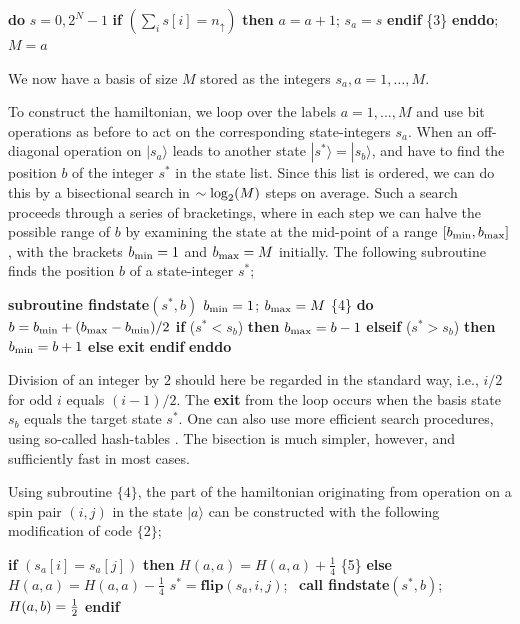 \documentclass[draft,numberedheadings]{aipproc}
\newcommand{\up}{\uparrow}
\newcommand{\half}{\hbox{$\frac{1}{2}$}}
\newcommand{\code}{\null\vskip-2mm\noindent}
\newcommand{\br}{\hfill\break}
\newcommand{\cia}{\null\hskip5mm}
\newcommand{\cib}{\null\hskip10mm}
\newcommand{\cic}{\null\hskip15mm}
\begin{document}
{\code
\cia {\bf do} $s=0,2^N-1$ \br
\cib     {\bf if} $(\sum_i s[i]=n_\up)$ {\bf then} $a=a+1$; $s_a=s$ {\bf endif} \hfill \{3\}\break
\cia {\bf enddo}; $M=a$
\code}

\noindent
We now have a basis of size $M$ stored as the integers $s_a,a=1,\ldots,M$.

To construct the hamiltonian, we loop over the labels $a=1,...,M$ and use bit operations as before to act on the corresponding state-integers $s_a$. When  
an off-diagonal operation on $|s_a\rangle$ leads to another state $|s^*\rangle=|s_b\rangle$, and have to find the position $b$ of the integer $s^*$
in the state list. Since this list is ordered, we can do this by a bisectional search in $\sim \log_{\rm 2}(M)$ steps on average. Such a search proceeds through 
a series of bracketings, where in each step we can halve the possible range of $b$ by examining the state at the mid-point of a range 
$[b_{\rm min},b_{\rm max}]$, with the brackets $b_{\rm min}=1$ and $b_{\rm max}=M$ initially. The following subroutine finds the position $b$ of 
a state-integer $s^*$;

{\code
\cia {\bf subroutine findstate}$(s^*,b)$ \br
\cia $b_{\rm min}=1$; $b_{\rm max}=M$      \hfill \{4\}\break
\cia {\bf do} \br
\cib     $b=b_{\rm min}+(b_{\rm max}-b_{\rm min})/2$ \br
\cib     {\bf if} ($s^*<s_b$) {\bf then} \br
\cic         $b_{\rm max}=b-1$ \br
\cib     {\bf elseif} ($s^*>s_b$) {\bf then} \br
\cic          $b_{\rm min}=b+1$ \br
\cib     {\bf else} \br
\cic          {\bf exit} \br
\cib     {\bf endif} \br
\cia {\bf enddo}
\code}

\noindent
Division of an integer by $2$ should here be regarded in the standard way, i.e., $i/2$ for odd $i$ equals $(i-1)/2$. The {\bf exit} 
from the loop occurs when the basis state $s_b$ equals the target state $s^*$. One can also use more efficient search procedures, using so-called 
hash-tables \cite{linhash}. The bisection is much simpler, however, and sufficiently fast in most cases.

Using subroutine $\{4\}$, the part of the hamiltonian originating from operation on a spin pair $(i,j)$ in the state $|a\rangle$ can be 
constructed with the following modification of code $\{2\}$;

{\code
\cia       {\bf if} $(s_a[i]=s_a[j])$ {\bf then} \br
\cib          $H(a,a)=H(a,a)+\frac{1}{4}$                     \hfill \{5\} \break
\cia       {\bf else} \br
\cib          $H(a,a)=H(a,a)-\frac{1}{4}$ \br
\cib          $s^*=\mathbf{flip}(s_a,i,j)$;~ {\bf call findstate}$(s^*,b)$;~ $H(a,b)=\half$ \br
\cia       {\bf endif}
\code}
\end{document}

